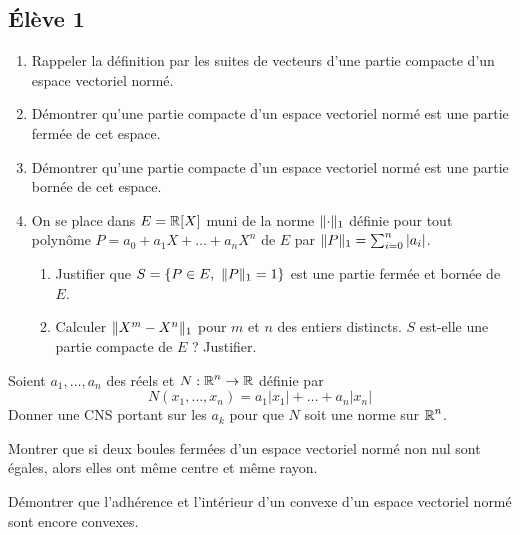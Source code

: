 \documentclass[10pt]{scrartcl}
\begin{document}
    \newpage
    \subsection*{Élève 1}
    \begin{ccp}
        \hfill
        \begin{enumerate}
            \item Rappeler la définition par les suites de vecteurs d'une partie compacte d'un espace vectoriel normé.
            \item Démontrer qu'une partie compacte d'un espace vectoriel normé est une partie fermée de cet espace.
            \item Démontrer qu'une partie compacte d'un espace vectoriel normé est une partie bornée de cet espace.
            \item On se place dans $E=\operatorname{\mathbb R}[X]$ muni de la norme $\lVert \cdot\rVert_1$ définie pour tout polynôme $P=a_0+a_1X+\dots+a_nX^n$ de $E$ par $\lVert P\rVert_1=\sum_{i=0}^n|a_i|$.
            \begin{enumerate}
                \item Justifier que $S=\lbrace P\in E,\ \norm{P}_1=1\rbrace$ est une partie fermée et bornée de $E$.
                \item Calculer $\lVert X^m-X^n\rVert_1$ pour $m$ et $n$ des entiers distincts. $S$ est-elle une partie compacte de $E$ ? Justifier.
            \end{enumerate}
        \end{enumerate}
    \end{ccp}

    \begin{exo}
        Soient $a_1,\dots,a_n$ des réels et $N:\operatorname{\mathbb R}^n\to\operatorname{\mathbb R}$ définie par 
        \[
            N(x_1,\dots,x_n)=a_1|x_1|+\dots+a_n|x_n|
        \]
        Donner une CNS portant sur les $a_k$ pour que $N$ soit une norme sur $\operatorname{\mathbb R}^n$.
    \end{exo}

    \begin{exo}
        Montrer que si deux boules fermées d'un espace vectoriel normé non nul sont égales, alors elles ont même centre et même rayon.
    \end{exo}

    \begin{exo}
        Démontrer que l'adhérence et l'intérieur d'un convexe d'un espace vectoriel normé sont encore convexes.
    \end{exo}
\end{document}
